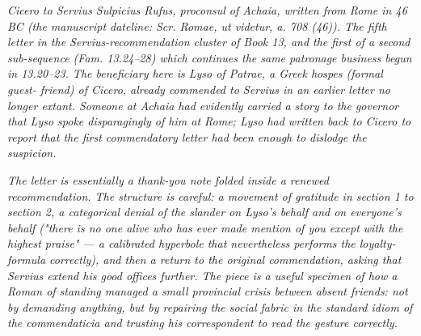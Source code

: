 
\textit{Cicero to Servius Sulpicius Rufus, proconsul of
Achaia, written from Rome in 46 BC (the manuscript
dateline: \textit{Scr. Romae, ut videtur, a. 708 (46)}).
The fifth letter in the Servius-recommendation cluster
of Book 13, and the first of a second sub-sequence
(Fam. 13.24--28) which continues the same patronage
business begun in 13.20--23. The beneficiary here is
Lyso of Patrae, a Greek \textit{hospes} (formal guest-
friend) of Cicero, already commended to Servius in an
earlier letter no longer extant. Someone at Achaia had
evidently carried a story to the governor that Lyso
spoke disparagingly of him at Rome; Lyso had written
back to Cicero to report that the first commendatory
letter had been enough to dislodge the suspicion.}

\textit{The letter is essentially a thank-you note
folded inside a renewed recommendation. The structure
is careful: a movement of gratitude in section 1 to
section 2, a categorical denial of the slander on Lyso's
behalf and on everyone's behalf ("there is no one alive
who has ever made mention of you except with the highest
praise" --- a calibrated hyperbole that nevertheless
performs the loyalty-formula correctly), and then a
return to the original commendation, asking that Servius
extend his good offices further. The piece is a useful
specimen of how a Roman of standing managed a small
provincial crisis between absent friends: not by
demanding anything, but by repairing the social fabric
in the standard idiom of the \textit{commendaticia} and
trusting his correspondent to read the gesture
correctly.}
